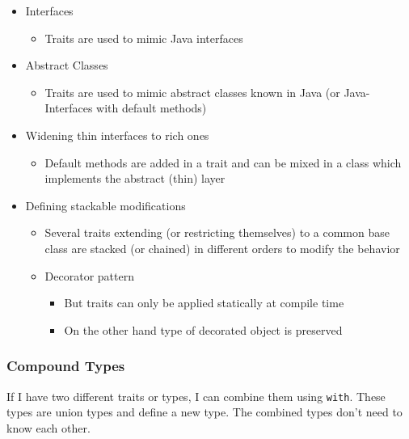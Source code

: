 \begin{itemize}
\tightlist
\item
  Interfaces

  \begin{itemize}
  \tightlist
  \item
    Traits are used to mimic Java interfaces
  \end{itemize}
\item
  Abstract Classes

  \begin{itemize}
  \tightlist
  \item
    Traits are used to mimic abstract classes known in Java (or Java-
    Interfaces with default methods)
  \end{itemize}
\item
  Widening thin interfaces to rich ones

  \begin{itemize}
  \tightlist
  \item
    Default methods are added in a trait and can be mixed in a class
    which implements the abstract (thin) layer
  \end{itemize}
\item
  Defining stackable modifications

  \begin{itemize}
  \tightlist
  \item
    Several traits extending (or restricting themselves) to a common
    base class are stacked (or chained) in different orders to modify
    the behavior
  \item
    Decorator pattern

    \begin{itemize}
    \tightlist
    \item
      But traits can only be applied statically at compile time
    \item
      On the other hand type of decorated object is preserved
    \end{itemize}
  \end{itemize}
\end{itemize}

\hypertarget{compound-types}{%
\subsubsection{Compound Types}\label{compound-types}}

If I have two different traits or types, I can combine them using
\texttt{with}. These types are union types and define a new type. The
combined types don't need to know each other.

\clearpage